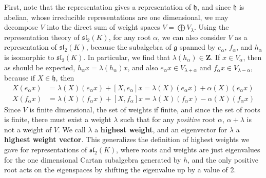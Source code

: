 First, note that the representation gives a representation of $\mathfrak{h}$, and since $\mathfrak{h}$ is abelian, whose irreducible representations are one dimensional, we may decompose $V$ into the direct sum of weight spaces $V = \bigoplus V_\lambda$. Using the representation theory of $\mathfrak{sl}_2(K)$, for any root $\alpha$, we can also consider $V$ as a representation of $\mathfrak{sl}_2(K)$, because the subalgebra of $\mathfrak{g}$ spanned by $e_\alpha$, $f_\alpha$, and $h_\alpha$ is isomorphic to $\mathfrak{sl}_2(K)$. In particular, we find that $\lambda(h_\alpha) \in \mathbf{Z}$. If $x \in V_\alpha$, then as should be expected, $h_\alpha x = \lambda(h_\alpha) x$, and also $e_\alpha x \in V_{\lambda + \alpha}$ and $f_\alpha x \in V_{\lambda - \alpha}$, because if $X \in \mathfrak{h}$, then
%
\begin{align*}
    X(e_\alpha x) &= \lambda(X) (e_\alpha x) + [X,e_\alpha]x = \lambda(X) (e_\alpha x) + \alpha(X) (e_\alpha x)\\
    X(f_\alpha x) &= \lambda(X) (f_\alpha x) + [X,f_\alpha]x = \lambda(X) (f_\alpha x) - \alpha(X) (f_\alpha x)
\end{align*}
%
Since $V$ is finite dimensional, the set of weights if finite, and since the set of roots is finite, there must exist a weight $\lambda$ such that for any {\it positive} root $\alpha$, $\alpha + \lambda$ is not a weight of $V$. We call $\lambda$ a {\bf highest weight}, and an eigenvector for $\lambda$ a {\bf highest weight vector}. This generalizes the definition of highest weights we gave for representations of $\mathfrak{sl}_2(K)$, where roots and weights are just eigenvalues for the one dimensional Cartan subalgebra generated by $h$, and the only positive root acts on the eigenspaces by shifting the eigenvalue up by a value of 2.

